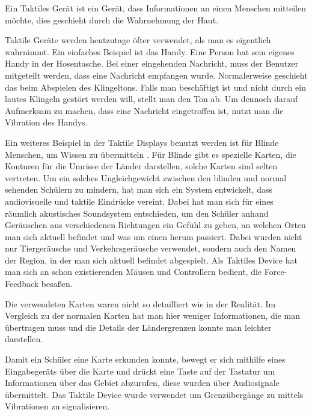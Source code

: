 
Ein Taktiles Ger{\"a}t ist ein Ger{\"a}t, dass Informationen an einen Menschen mitteilen m{\"o}chte, dies geschieht durch die Wahrnehmung der Haut. \cite{gemperle2001design}

Taktile Ger{\"a}te werden heutzutage {\"o}fter verwendet, als man es eigentlich wahrnimmt. 
Ein einfaches Beispiel ist das Handy. 
Eine Person hat sein eigenes Handy in der Hosentasche. Bei einer eingehenden Nachricht, muss der Benutzer mitgeteilt werden, dass eine Nachricht empfangen wurde.
Normalerweise geschieht das beim Abspielen des Klingeltons. Falls man besch{\"a}ftigt ist und nicht durch ein lautes Klingeln gest{\"o}rt werden will, stellt man den Ton ab. 
Um dennoch darauf Aufmerksam zu machen, dass eine Nachricht eingetroffen ist, nutzt man die Vibration des Handys.

Ein weiteres Beispiel in der Taktile Displays benutzt werden ist f{\"u}r Blinde Menschen, um Wissen zu {\"u}bermitteln \cite{parente2003bats}. 
F{\"u}r Blinde gibt es spezielle Karten, die Konturen f{\"u}r die Umrisse der L{\"a}nder darstellen, solche Karten sind selten vertreten.
Um ein solches Ungleichgewicht zwischen den blinden und normal sehenden Sch{\"u}lern zu mindern, hat man sich ein System entwickelt, dass audiovisuelle und taktile Eindr{\"u}cke vereint. 
Dabei hat man sich f{\"u}r eines r{\"a}umlich akustisches Soundsystem entschieden, um den Sch{\"u}ler anhand Ger{\"a}uschen aus verschiedenen Richtungen ein Gef{\"u}hl zu geben, an welchen Orten man sich aktuell befindet und was um einen herum passiert. 
Dabei wurden nicht nur Tierger{\"a}usche und Verkehrsger{\"a}usche verwendet, sondern auch den Namen der Region, in der man sich aktuell befindet abgespielt. 
Als Taktiles Device hat man sich an schon existierenden M{\"a}usen und Controllern bedient, die Force-Feedback besa{\ss}en. 

Die verwendeten Karten waren nicht so detailliert wie in der Realit{\"a}t.
Im Vergleich zu der normalen Karten hat man hier weniger Informationen, die man {\"u}bertragen muss und die Details der L{\"a}ndergrenzen konnte man leichter darstellen. 

Damit ein Sch{\"u}ler eine Karte erkunden konnte, bewegt er sich mithilfe eines Eingabeger{\"a}ts {\"u}ber die Karte und dr{\"u}ckt eine Taste auf der Tastatur um Informationen {\"u}ber das Gebiet abzurufen, diese wurden {\"u}ber Audiosignale {\"u}bermittelt. Das Taktile Device wurde verwendet um Grenz{\"u}berg{\"a}nge zu mittels Vibrationen zu signalisieren.


